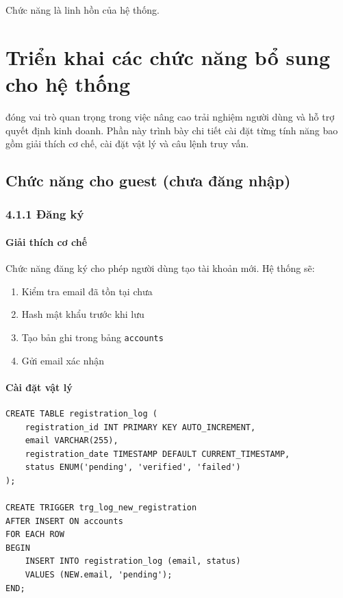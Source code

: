 \begin{savequote}[75mm]
Chức năng là linh hồn của hệ thống.
\end{savequote}

\chapter{Triển khai các chức năng bổ sung cho hệ thống}

 đóng vai trò quan trọng trong việc nâng cao trải nghiệm người dùng và hỗ trợ quyết định kinh doanh. Phần này trình bày chi tiết cài đặt từng tính năng bao gồm giải thích cơ chế, cài đặt vật lý và câu lệnh truy vấn.

\section{Chức năng cho guest (chưa đăng nhập)}

\subsection{4.1.1 Đăng ký}

\subsubsection{Giải thích cơ chế}

Chức năng đăng ký cho phép người dùng tạo tài khoản mới. Hệ thống sẽ:
\begin{enumerate}
    \item Kiểm tra email đã tồn tại chưa
    \item Hash mật khẩu trước khi lưu
    \item Tạo bản ghi trong bảng \texttt{accounts}
    \item Gửi email xác nhận
\end{enumerate}

\subsubsection{Cài đặt vật lý}

\begin{verbatim}
CREATE TABLE registration_log (
    registration_id INT PRIMARY KEY AUTO_INCREMENT,
    email VARCHAR(255),
    registration_date TIMESTAMP DEFAULT CURRENT_TIMESTAMP,
    status ENUM('pending', 'verified', 'failed')
);

CREATE TRIGGER trg_log_new_registration
AFTER INSERT ON accounts
FOR EACH ROW
BEGIN
    INSERT INTO registration_log (email, status)
    VALUES (NEW.email, 'pending');
END;
\end{verbatim}

